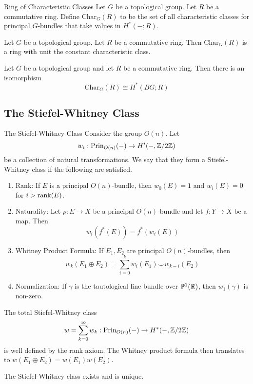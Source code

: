 \documentclass[a4paper]{article}
\begin{document}
\begin{defn}{Ring of Characteristic Classes}{} Let $G$ be a topological group. Let $R$ be a commutative ring. Define $\text{Char}_G(R)$ to be the set of all characteristic classes for principal $G$-bundles that take values in $H^\ast(-;R)$. 
\end{defn}

\begin{prp}{}{} Let $G$ be a topological group. Let $R$ be a commutative ring. Then $\text{Char}_G(R)$ is a ring with unit the constant characteristic class. 
\end{prp}

\begin{thm}{}{} Let $G$ be a topological group and let $R$ be a commutative ring. Then there is an isomorphism $$\text{Char}_G(R)\cong H^\ast(BG;R)$$
\end{thm}

\subsection{The Stiefel-Whitney Class}
\begin{defn}{The Stiefel-Whitney Class}{} Consider the group $O(n)$. Let $$w_i:\text{Prin}_{O(n)}(-)\to H^i(-,\mathbb{Z}/2\mathbb{Z})$$ be a collection of natural transformations. We say that they form a Stiefel-Whitney class if the following are satisfied. 
\begin{enumerate}
\item Rank: If $E$ is a principal $O(n)$-bundle, then $w_0(E)=1$ and $w_i(E)=0$ for $i>\rank(E)$. 
\item Naturality: Let $p:E\to X$ be a principal $O(n)$-bundle and let $f:Y\to X$ be a map. Then $$w_i(f^\ast(E))=f^\ast(w_i(E))$$
\item Whitney Product Formula: If $E_1,E_2$ are principal $O(n)$-bundles, then $$w_k(E_1\oplus E_2)=\sum_{i=0}^kw_i(E_1)\smile w_{k-i}(E_2)$$
\item Normalization: If $\gamma$ is the tautological line bundle over $\mathbb{P}^1(\mathbb{R})$, then $w_1(\gamma)$ is non-zero. 
\end{enumerate}
The total Stiefel-Whitney class $$w=\sum_{k=0}^\infty w_k:\text{Prin}_{O(n)}(-)\to H^\ast(-,\mathbb{Z}/2\mathbb{Z})$$ is well defined by the rank axiom. The Whitney product formula then translates to $w(E_1\oplus E_2)=w(E_1)w(E_2)$. 
\end{defn}

\begin{thm}{}{} The Stiefel-Whitney class exists and is unique. 
\end{thm}
\end{document}
